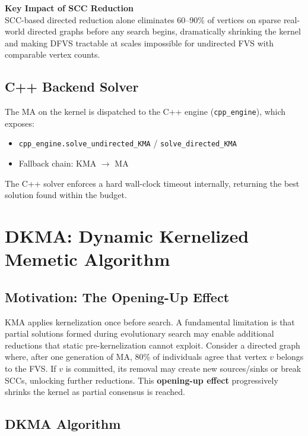 \documentclass[10pt,a4paper]{report}
\theoremstyle{definition}
\newcommand{\kma}{\textsc{KMA}}
\newcommand{\infobox}[2]{%
  \begin{center}
    \colorbox{buetblue!8}{%
      \begin{minipage}{0.93\textwidth}
        \vspace{4pt}
        \textbf{\color{buetblue}#1}\\[2pt]
        #2
        \vspace{4pt}
      \end{minipage}%
    }
  \end{center}
}
\begin{document}
\infobox{Key Impact of SCC Reduction}{
	SCC-based directed reduction alone eliminates 60--90\% of vertices on sparse real-world directed graphs before any search begins, dramatically shrinking the kernel and making DFVS tractable at scales impossible for undirected FVS with comparable vertex counts.
}

\section{C++ Backend Solver}

The MA on the kernel is dispatched to the C++ engine (\texttt{cpp\_engine}), which exposes:
\begin{itemize}
	\item \texttt{cpp\_engine.solve\_undirected\_KMA} / \texttt{solve\_directed\_KMA}
	\item Fallback chain: KMA $\to$ MA
\end{itemize}

The C++ solver enforces a hard wall-clock timeout internally, returning the best solution found within the budget.

\chapter{DKMA: Dynamic Kernelized Memetic Algorithm}
\label{ch:dkma}

\section{Motivation: The Opening-Up Effect}

\kma{} applies kernelization once before search. A fundamental limitation is that partial solutions formed during evolutionary search may enable additional reductions that static pre-kernelization cannot exploit.
Consider a directed graph where, after one generation of MA, 80\% of individuals agree that vertex $v$ belongs to the FVS. If $v$ is committed, its removal may create new sources/sinks or break SCCs, unlocking further reductions. This \textbf{opening-up effect} \cite{grossmann2022ipec} progressively shrinks the kernel as partial consensus is reached.

\section{DKMA Algorithm}
\end{document}

